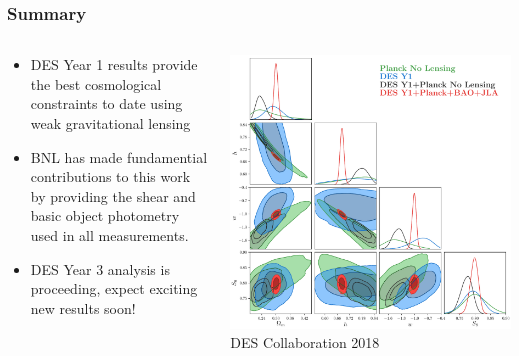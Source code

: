 \documentclass[aspectratio=169]{beamer}
\begin{document}
\frame
{

    \frametitle{Summary}


    \begin{columns}
        \begin{column}{0.5\textwidth}
            \begin{itemize}

                \item DES Year 1 results provide the best
                    cosmological constraints to date using
                    weak gravitational lensing

                \item BNL has made fundamential contributions to this work by
                    providing the shear and basic object photometry used in
                    all measurements.

                \item DES Year 3 analysis is proceeding, expect exciting
                    new results soon!

            \end{itemize}

        \end{column}
        \begin{column}{0.5\textwidth}
            \centering
                \includegraphics[width=\linewidth]{dpnl_w_4.pdf}
                \newline
                {\tiny DES Collaboration 2018}
        \end{column}

    \end{columns}

}
\end{document}
